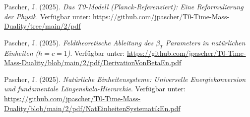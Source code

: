 \documentclass[12pt,a4paper]{article}
\begin{document}
	\newpage
	\begin{thebibliography}{99}
		Pascher, J. (2025). \textit{Das T0-Modell (Planck-Referenziert): Eine Reformulierung der Physik}. Verfügbar unter: \url{https://github.com/jpascher/T0-Time-Mass-Duality/tree/main/2/pdf}
		
		Pascher, J. (2025). \textit{Feldtheoretische Ableitung des $\beta_T$ Parameters in natürlichen Einheiten ($\hbar = c = 1$)}. Verfügbar unter: \url{https://github.com/jpascher/T0-Time-Mass-Duality/blob/main/2/pdf/DerivationVonBetaEn.pdf}
		
		Pascher, J. (2025). \textit{Natürliche Einheitensysteme: Universelle Energiekonversion und fundamentale Längenskala-Hierarchie}. Verfügbar unter: \url{https://github.com/jpascher/T0-Time-Mass-Duality/blob/main/2/pdf/NatEinheitenSystematikEn.pdf}
		
	\end{thebibliography}
	
\end{document}
